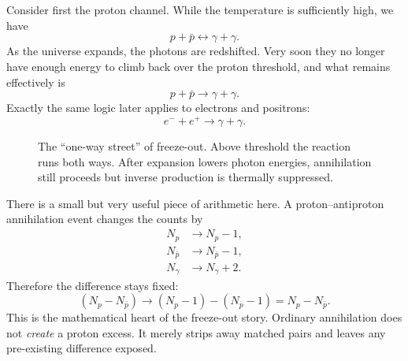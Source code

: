 Consider first the proton channel. While the temperature is sufficiently high, we have
\begin{equation}
p+\bar p \leftrightarrow \gamma+\gamma.
\end{equation}
As the universe expands, the photons are redshifted. Very soon they no longer have enough energy to climb back over the proton threshold, and what remains effectively is
\begin{equation}
p+\bar p \to \gamma+\gamma.
\end{equation}
Exactly the same logic later applies to electrons and positrons:
\begin{equation}
e^-+e^+ \to \gamma+\gamma.
\end{equation}

\begin{figure}[ht]
\centering
{}%
\caption{The ``one-way street'' of freeze-out. Above threshold the reaction runs both ways. After expansion lowers photon energies, annihilation still proceeds but inverse production is thermally suppressed.}
\end{figure}

There is a small but very useful piece of arithmetic here. A proton--antiproton annihilation event changes the counts by
\begin{align}
N_p &\to N_p-1,\\
N_{\bar p} &\to N_{\bar p}-1,\\
N_\gamma &\to N_\gamma+2.
\end{align}
Therefore the difference stays fixed:
\begin{equation}
(N_p-N_{\bar p}) \to (N_p-1)-(N_{\bar p}-1)=N_p-N_{\bar p}.
\end{equation}
This is the mathematical heart of the freeze-out story. Ordinary annihilation does not \emph{create} a proton excess. It merely strips away matched pairs and leaves any pre-existing difference exposed.

